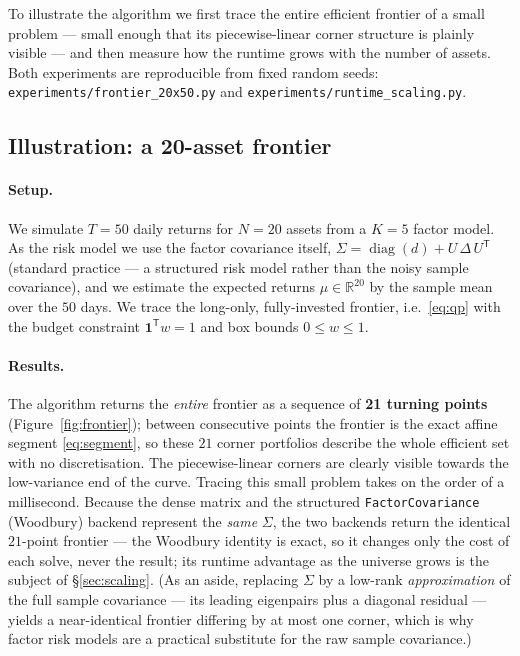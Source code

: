 \documentclass[11pt]{article}
\newcommand{\R}{\mathbb{R}}
\newcommand{\Sig}{\Sigma}
\newcommand{\trans}{^{\mathsf{T}}}
\begin{document}
To illustrate the algorithm we first trace the entire efficient frontier of a
small problem --- small enough that its piecewise-linear corner structure is
plainly visible --- and then measure how the runtime grows with the number of
assets. Both experiments are reproducible from fixed random seeds:
\texttt{experiments/frontier\_20x50.py} and
\texttt{experiments/runtime\_scaling.py}.

\subsection{Illustration: a 20-asset frontier}

\paragraph{Setup.}
We simulate $T = 50$ daily returns for $N = 20$ assets from a $K = 5$ factor
model. As the risk model we use the factor covariance itself,
$\Sig = \operatorname{diag}(d) + U\,\Delta\,U\trans$ (standard practice --- a
structured risk model rather than the noisy sample covariance), and we estimate
the expected returns $\mu \in \R^{20}$ by the sample mean over the $50$ days.
We trace the long-only, fully-invested frontier, i.e.\ \eqref{eq:qp} with the
budget constraint $\mathbf{1}\trans w = 1$ and box bounds $0 \le w \le 1$.

\paragraph{Results.}
The algorithm returns the \emph{entire} frontier as a sequence of
\textbf{21 turning points} (Figure~\ref{fig:frontier}); between consecutive
points the frontier is the exact affine segment \eqref{eq:segment}, so these
$21$ corner portfolios describe the whole efficient set with no discretisation.
The piecewise-linear corners are clearly visible towards the low-variance end of
the curve. Tracing this small problem takes on the order of a millisecond.
Because the dense matrix and the structured \texttt{FactorCovariance} (Woodbury)
backend represent the \emph{same} $\Sig$, the two backends return the identical
$21$-point frontier --- the Woodbury identity is exact, so it changes only the
cost of each solve, never the result; its runtime advantage as the universe grows
is the subject of \S\ref{sec:scaling}. (As an aside, replacing $\Sig$ by a
low-rank \emph{approximation} of the full sample covariance --- its leading
eigenpairs plus a diagonal residual --- yields a near-identical frontier differing
by at most one corner, which is why factor risk models are a practical substitute
for the raw sample covariance.)
\end{document}
